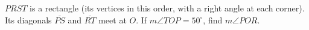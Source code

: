 $PRST$ is a rectangle (its vertices in this order, with a right angle at each corner). Its diagonals $\overline{PS}$ and $\overline{RT}$ meet at $O$. If $m\angle TOP=50^\circ$, find $m\angle POR$.
